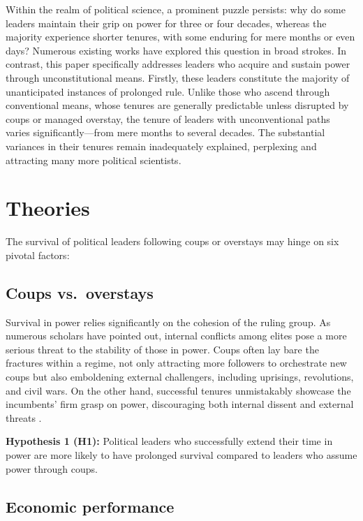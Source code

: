 \documentclass[
  a4paper,
  12pt]{article}
\begin{document}
Within the realm of political science, a prominent puzzle persists: why
do some leaders maintain their grip on power for three or four decades,
whereas the majority experience shorter tenures, with some enduring for
mere months or even days? Numerous existing works
\citep[\citet{buenodemesquita2003}]{clinton1975politics} have explored
this question in broad strokes. In contrast, this paper specifically
addresses leaders who acquire and sustain power through unconstitutional
means. Firstly, these leaders constitute the majority of unanticipated
instances of prolonged rule. Unlike those who ascend through
conventional means, whose tenures are generally predictable unless
disrupted by coups or managed overstay, the tenure of leaders with
unconventional paths varies significantly---from mere months to several
decades. The substantial variances in their tenures remain inadequately
explained, perplexing and attracting many more political scientists.

\section{Theories}\label{theories}

The survival of political leaders following coups or overstays may hinge
on six pivotal factors:

\subsection{Coups vs.~overstays}\label{coups-vs.-overstays}

Survival in power relies significantly on the cohesion of the ruling
group. As numerous scholars have pointed out, internal conflicts among
elites pose a more serious threat to the stability of those in power.
Coups often lay bare the fractures within a regime, not only attracting
more followers to orchestrate new coups but also emboldening external
challengers, including uprisings, revolutions, and civil wars. On the
other hand, successful tenures unmistakably showcase the incumbents'
firm grasp on power, discouraging both internal dissent and external
threats \citep{dahl2023}.

\textbf{Hypothesis 1 (H1):} Political leaders who successfully extend
their time in power are more likely to have prolonged survival compared
to leaders who assume power through coups.

\subsection{Economic performance}\label{economic-performance}
\end{document}
